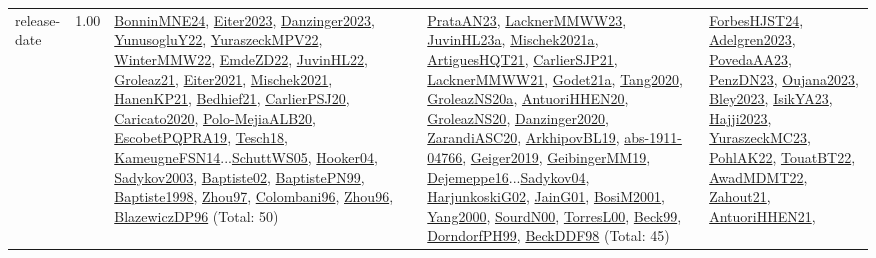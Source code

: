 {\begin{longtable}{p{3cm}r>{\raggedright\arraybackslash}p{6cm}>{\raggedright\arraybackslash}p{6cm}>{\raggedright\arraybackslash}p{8cm}}
\index{release-date}\index{Concepts!release-date}release-date &  1.00 & \hyperref[detail:BonninMNE24]{BonninMNE24}, \hyperref[detail:Eiter2023]{Eiter2023}, \hyperref[detail:Danzinger2023]{Danzinger2023}, \hyperref[detail:YunusogluY22]{YunusogluY22}, \hyperref[detail:YuraszeckMPV22]{YuraszeckMPV22}, \hyperref[detail:WinterMMW22]{WinterMMW22}, \hyperref[detail:EmdeZD22]{EmdeZD22}, \hyperref[detail:JuvinHL22]{JuvinHL22}, \hyperref[detail:Groleaz21]{Groleaz21}, \hyperref[detail:Eiter2021]{Eiter2021}, \hyperref[detail:Mischek2021]{Mischek2021}, \hyperref[detail:HanenKP21]{HanenKP21}, \hyperref[detail:Bedhief21]{Bedhief21}, \hyperref[detail:CarlierPSJ20]{CarlierPSJ20}, \hyperref[detail:Caricato2020]{Caricato2020}, \hyperref[detail:Polo-MejiaALB20]{Polo-MejiaALB20}, \hyperref[detail:EscobetPQPRA19]{EscobetPQPRA19}, \hyperref[detail:Tesch18]{Tesch18}, \hyperref[detail:KameugneFSN14]{KameugneFSN14}...\hyperref[detail:SchuttWS05]{SchuttWS05}, \hyperref[detail:Hooker04]{Hooker04}, \hyperref[detail:Sadykov2003]{Sadykov2003}, \hyperref[detail:Baptiste02]{Baptiste02}, \hyperref[detail:BaptistePN99]{BaptistePN99}, \hyperref[detail:Baptiste1998]{Baptiste1998}, \hyperref[detail:Zhou97]{Zhou97}, \hyperref[detail:Colombani96]{Colombani96}, \hyperref[detail:Zhou96]{Zhou96}, \hyperref[detail:BlazewiczDP96]{BlazewiczDP96} (Total: 50) & \hyperref[detail:PrataAN23]{PrataAN23}, \hyperref[detail:LacknerMMWW23]{LacknerMMWW23}, \hyperref[detail:JuvinHL23a]{JuvinHL23a}, \hyperref[detail:Mischek2021a]{Mischek2021a}, \hyperref[detail:ArtiguesHQT21]{ArtiguesHQT21}, \hyperref[detail:CarlierSJP21]{CarlierSJP21}, \hyperref[detail:LacknerMMWW21]{LacknerMMWW21}, \hyperref[detail:Godet21a]{Godet21a}, \hyperref[detail:Tang2020]{Tang2020}, \hyperref[detail:GroleazNS20a]{GroleazNS20a}, \hyperref[detail:AntuoriHHEN20]{AntuoriHHEN20}, \hyperref[detail:GroleazNS20]{GroleazNS20}, \hyperref[detail:Danzinger2020]{Danzinger2020}, \hyperref[detail:ZarandiASC20]{ZarandiASC20}, \hyperref[detail:ArkhipovBL19]{ArkhipovBL19}, \hyperref[detail:abs-1911-04766]{abs-1911-04766}, \hyperref[detail:Geiger2019]{Geiger2019}, \hyperref[detail:GeibingerMM19]{GeibingerMM19}, \hyperref[detail:Dejemeppe16]{Dejemeppe16}...\hyperref[detail:Sadykov04]{Sadykov04}, \hyperref[detail:HarjunkoskiG02]{HarjunkoskiG02}, \hyperref[detail:JainG01]{JainG01}, \hyperref[detail:BosiM2001]{BosiM2001}, \hyperref[detail:Yang2000]{Yang2000}, \hyperref[detail:SourdN00]{SourdN00}, \hyperref[detail:TorresL00]{TorresL00}, \hyperref[detail:Beck99]{Beck99}, \hyperref[detail:DorndorfPH99]{DorndorfPH99}, \hyperref[detail:BeckDDF98]{BeckDDF98} (Total: 45) & \hyperref[detail:ForbesHJST24]{ForbesHJST24}, \hyperref[detail:Adelgren2023]{Adelgren2023}, \hyperref[detail:PovedaAA23]{PovedaAA23}, \hyperref[detail:PenzDN23]{PenzDN23}, \hyperref[detail:Oujana2023]{Oujana2023}, \hyperref[detail:Bley2023]{Bley2023}, \hyperref[detail:IsikYA23]{IsikYA23}, \hyperref[detail:Hajji2023]{Hajji2023}, \hyperref[detail:YuraszeckMC23]{YuraszeckMC23}, \hyperref[detail:PohlAK22]{PohlAK22}, \hyperref[detail:TouatBT22]{TouatBT22}, \hyperref[detail:AwadMDMT22]{AwadMDMT22}, \hyperref[detail:Zahout21]{Zahout21}, \hyperref[detail:AntuoriHHEN21]{AntuoriHHEN21}, 
\end{longtable}}
